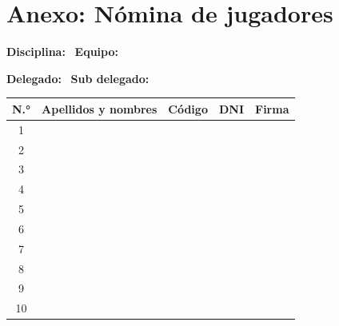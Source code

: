 	\clearpage
	\section*{Anexo: Nómina de jugadores}

	\noindent\textbf{Disciplina:} \hrulefill\ \textbf{Equipo:} \hrulefill\par\vspace{0.4em}
	\noindent\textbf{Delegado:} \hrulefill\ \textbf{Sub delegado:} \hrulefill\par\vspace{0.8em}

	\renewcommand{\arraystretch}{2.1}
	\noindent\begin{tabularx}{\linewidth}{|c|X|p{2.4cm}|p{2.4cm}|p{2.4cm}|}
		\hline
		\textbf{N.°} & \textbf{Apellidos y nombres} & \textbf{Código} & \textbf{DNI} & \textbf{Firma}\\ \hline
		1 & & & & \\ \hline
		2 & & & & \\ \hline
		3 & & & & \\ \hline
		4 & & & & \\ \hline
		5 & & & & \\ \hline
		6 & & & & \\ \hline
		7 & & & & \\ \hline
		8 & & & & \\ \hline
		9 & & & & \\ \hline
		10 & & & & \\ \hline
	\end{tabularx}


